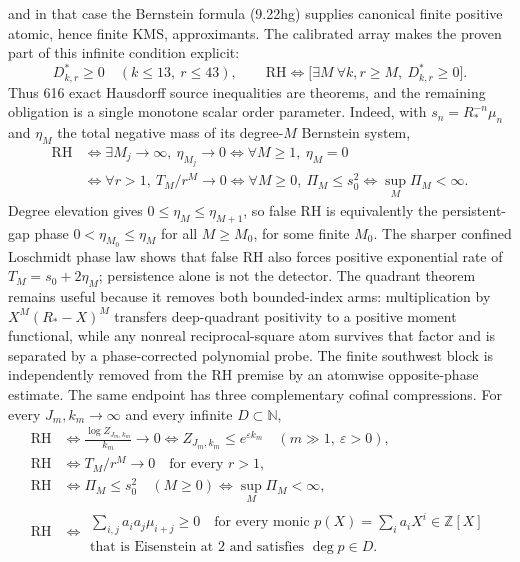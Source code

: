 \documentclass[11pt]{article}
\begin{document}
and in that case the Bernstein formula \textup{(9.22hg)} supplies canonical finite positive
atomic, hence finite KMS, approximants.  The calibrated array makes the proven part of this
infinite condition explicit:
\[
 D^*_{k,r}\ge0\quad(k\le13,\ r\le43),
 \qquad
 \mathrm{RH}\Longleftrightarrow
 \bigl[\exists M\ \forall k,r\ge M,\ D^*_{k,r}\ge0\bigr].
 \tag{11.3b}
\]
Thus 616 exact Hausdorff source inequalities are theorems, and the remaining obligation is a
single monotone scalar order parameter.  Indeed, with $s_n=R_*^{-n}\mu_n$ and $\eta_M$ the total
negative mass of its degree-$M$ Bernstein system,
\[
 \begin{aligned}
 \mathrm{RH}
 &\Longleftrightarrow
 \exists M_j\to\infty,\ \eta_{M_j}\longrightarrow0
 \Longleftrightarrow
 \forall M\ge1,\ \eta_M=0\\
 &\Longleftrightarrow
 \forall r>1,\ T_M/r^M\longrightarrow0
 \Longleftrightarrow
 \forall M\ge0,\ \Pi_M\le s_0^2
 \Longleftrightarrow
 \sup_M\Pi_M<\infty.
 \end{aligned}
 \tag{11.3bb}
\]
Degree elevation gives $0\le\eta_M\le\eta_{M+1}$, so false RH is equivalently the persistent-gap
phase $0<\eta_{M_0}\le\eta_M$ for all $M\ge M_0$, for some finite $M_0$.  The sharper
confined Loschmidt phase law shows that false RH also forces positive exponential rate of
$T_M=s_0+2\eta_M$; persistence alone is not the detector.  The quadrant theorem
remains useful because it removes both bounded-index arms:
multiplication by $X^M(R_*-X)^M$ transfers deep-quadrant positivity to a positive moment
functional, while any nonreal reciprocal-square atom survives that factor and is separated by a
phase-corrected polynomial probe.  The finite southwest block is independently removed from the
RH premise by an atomwise opposite-phase estimate.
The same endpoint has three complementary cofinal compressions.  For every $J_m,k_m\to\infty$ and every
infinite $D\subset\mathbb N$,
\[
 \boxed{\begin{aligned}
 \mathrm{RH}
 &\Longleftrightarrow
 \frac{\log Z_{J_m,k_m}}{k_m}\longrightarrow0
 \Longleftrightarrow
 Z_{J_m,k_m}\le e^{\varepsilon k_m}\quad(m\gg1,\ \varepsilon>0),\\
 \mathrm{RH}
 &\Longleftrightarrow
 T_M/r^M\longrightarrow0\quad\text{for every }r>1,\\
 \mathrm{RH}
 &\Longleftrightarrow
 \Pi_M\le s_0^2\quad(M\ge0)
 \Longleftrightarrow \sup_M\Pi_M<\infty,\\
 \mathrm{RH}
 &\Longleftrightarrow
 \substack{\displaystyle\sum_{i,j}a_i a_j\mu_{i+j}\ge0
 \quad\text{for every monic }p(X)=\sum_i a_iX^i\in\mathbb Z[X]\\
 \text{that is Eisenstein at }2\text{ and satisfies }\deg p\in D.}
 \end{aligned}}
 \tag{11.3c}
\]
\end{document}
